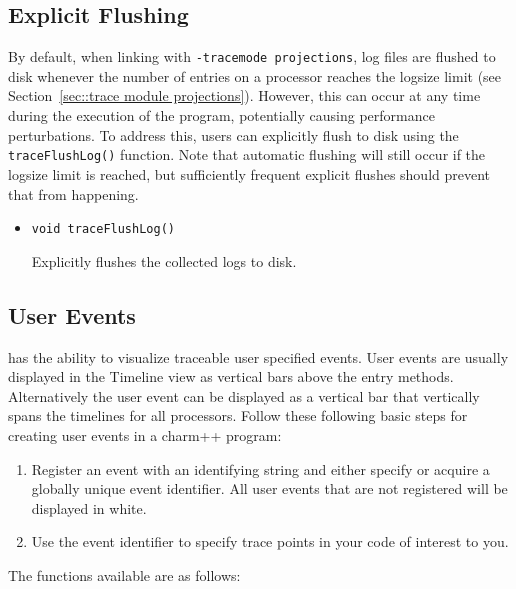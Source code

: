 \subsection{Explicit Flushing}
\label{sec::explicit flushing}

By default, when linking with {\tt -tracemode projections}, log files
are flushed to disk whenever the number of entries on a processor
reaches the logsize limit (see Section~\ref{sec::trace module
projections}). However, this can occur at any time during the execution
of the program, potentially causing performance perturbations. To
address this, users can explicitly flush to disk using the {\tt
traceFlushLog()} function.  Note that automatic flushing will
still occur if the logsize limit is reached, but sufficiently frequent
explicit flushes should prevent that from happening.

\begin{itemize}
\item
{\tt void traceFlushLog()}

Explicitly flushes the collected logs to disk.

\end{itemize}

\subsection{User Events}
\label{sec::user events}

\projections{} has the ability to visualize traceable user
specified events. User events are usually displayed in the Timeline view as vertical bars above the entry methods. Alternatively the user event can be displayed as a vertical bar that vertically spans the timelines for all processors. Follow these following basic steps for creating user events in a charm++ program:

\begin{enumerate}
\item
Register an event with an identifying string and either specify or acquire
a globally unique event identifier. All user events that are not registered will be displayed in white.

\item
Use the event identifier to specify trace points in your code of interest to you.
\end{enumerate}

The functions available are as follows:

